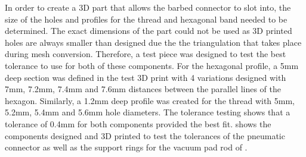 In order to create a 3D part that allows the barbed connector to slot into, the size of the holes and profiles for the thread and hexagonal band needed to be determined. The exact dimensions of the part could not be used as 3D printed holes are always smaller than designed due the the triangulation that takes place during mesh conversion. Therefore, a test piece was designed to test the best tolerance to use for both of these components. For the hexagonal profile, a 5mm deep section was defined in the test 3D print with 4 variations designed with 7mm, 7.2mm, 7.4mm and 7.6mm distances between the parallel lines of the hexagon. Similarly, a 1.2mm deep profile was created for the thread with 5mm, 5.2mm, 5.4mm and 5.6mm hole diameters. The tolerance testing shows that a tolerance of 0.4mm for both components provided the best fit.  shows the components designed and 3D printed to test the tolerances of the pneumatic connector as well as the support rings for the vacuum pad rod of .
